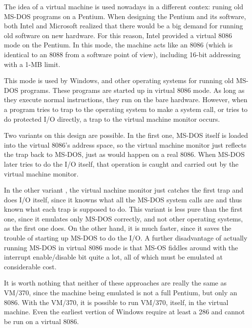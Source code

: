 \documentclass{book}
\begin{document}
The idea of a virtual machine is used nowadays in a different contex: runing old MS-DOS programs on a Pentium.
When designing the Pentium and its software, both Intel and Microsoft realized that 
there would be a big demand for running old software on new hardware.
For this reason, Intel provided a virtual 8086 mode on the Pentium.
In this mode, the machine acts like an 8086 (which is identical to an 8088 from a software point of view),
including 16-bit addressing with a 1-MB limit.

This mode is used by Windows, and other operating systems for running old MS-DOS programs.
These programs are started up in virtual 8086 mode.
As long as they execute normal instructions, they run on the bare hardware.
However, when a program tries to trap to the operating system to make a system call,
or tries to do protected I/O directly, a trap to the virtual machine monitor occurs.

Two variants on this design are possible.
In the first one, MS-DOS itself is loaded into the virtual 8086's address space, 
so the virtual machine monitor just reflects the trap back to MS-DOS, just as would happen on a real 8086.
When MS-DOS later tries to do the I/O itself, that operation is caught and carried out by the virtual machine monitor.

In the other variant , the virtual nachine monitor just catches the first trap and does I/O itself,
since it knowns what all the MS-DOS system calls are and thus known what each trap is supposed to do.
This variant is less pure than the first one, since it emulates only MS-DOS correctly, and not other operating systems, as the first one does.
On the other hand, it is much faster, since it saves the trouble of starting up MS-DOS to do the I/O.
A further disadvantage of actually running MS-DOS in virtual 8086 mode is that MS-OS fiddles around with the interrupt enable/disable bit quite a lot, 
all of which must be emulated at considerable cost.

It is worth nothing that neither of these approaches are really the same as VM/370, 
since the machine being emulated is not a full Pentium, but only an 8086.
With the VM/370, it is possible to run VM/370, itself, in the virtual machine.
Even the earliest vertion of Windows require at least a 286 and cannot be run on a virtual 8086. 
\end{document}
